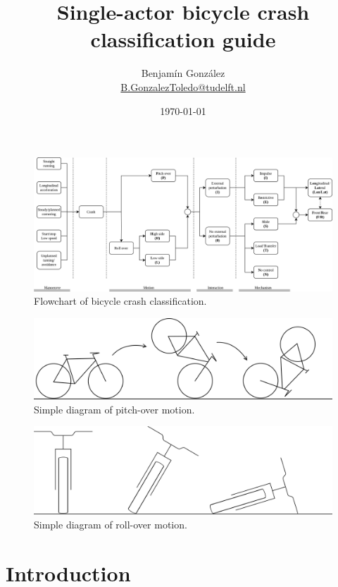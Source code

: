 \documentclass{article}
\title{Single-actor bicycle crash classification guide}
\author{
  Benjam\'in Gonz\'alez\\
  \small{\href{mailto:b.gonzaleztoledo@tudelft.nl}{B.GonzalezToledo@tudelft.nl}}
  }
\date{\today}
\begin{document}
\maketitle

\begin{figure}[h]
    \centering
    \includegraphics[width=\linewidth]{class-mindmap.png}
    \caption{Flowchart of bicycle crash classification.}
    \label{fig: flowchart}
\end{figure}

\begin{figure}[h]
    \centering
    \includegraphics[width=\linewidth]{pitch-over.png}
    \caption{Simple diagram of pitch-over motion.}
    \label{fig: flowchart}
\end{figure}

\begin{figure}[h]
    \centering
    \includegraphics[width=\linewidth]{roll-over.png}
    \caption{Simple diagram of roll-over motion.}
    \label{fig: flowchart}
\end{figure}
\section{Introduction}
\end{document}
